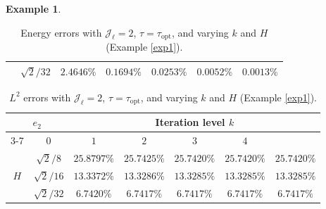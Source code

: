 \documentclass{article}[11pt]
\theoremstyle{definition}
\newtheorem{exmp}{Example}[section]
\begin{document}
\begin{exmp}
\begin{table}[ht]
\begin{tabular}{cc||ccccc}
\multicolumn{1}{c|}{} &  
$\sqrt{2}/32$ & $2.4646\%$ & $0.1694\%$ & $0.0253\%$ & $0.0052\%$ & $0.0013\%$ \\
\hline
\end{tabular}
\caption{Energy errors with $\mathcal{J}_{\ell} = 2$, $\tau = \tau_{\text{opt}}$, and varying $k$ and $H$ (Example \ref{exp1}).}
\label{tab:exp1-v}
\end{table}

\begin{table}[ht]
\centering
\begin{tabular}{cc||ccccc}
\hline
\multicolumn{2}{c||}{\multirow{2}{*}{$e_2$}}   & \multicolumn{5}{c}{Iteration level $k$}           \\ \cline{3-7} 
\multicolumn{2}{c||}{} &   $0$ & $1$   & $2$   & $3$   & $4$   \\ 
\hline \hline
\multicolumn{1}{c|}{\multirow{3}{*}{$H$}} & 
$\sqrt{2}/8$ & $25.8797\%$ & $25.7425\%$ & $25.7420\%$ & $25.7420\%$ & $25.7420\%$ \\

\multicolumn{1}{c|}{} &  
$\sqrt{2}/16$ & $13.3372\%$ & $13.3286\%$ & $13.3285\%$ & $13.3285\%$ & $13.3285\%$ \\

\multicolumn{1}{c|}{} &  
$\sqrt{2}/32$ & $6.7420\%$ & $6.7417\%$ & $6.7417\%$ & $6.7417\%$ & $6.7417\%$ \\

\hline
\end{tabular}
\caption{$L^2$ errors with $\mathcal{J}_{\ell} = 2$, $\tau = \tau_{\text{opt}}$, and varying $k$ and $H$ (Example \ref{exp1}).}
\label{tab:exp1-p}
\end{table}
\end{exmp}
\end{document}
